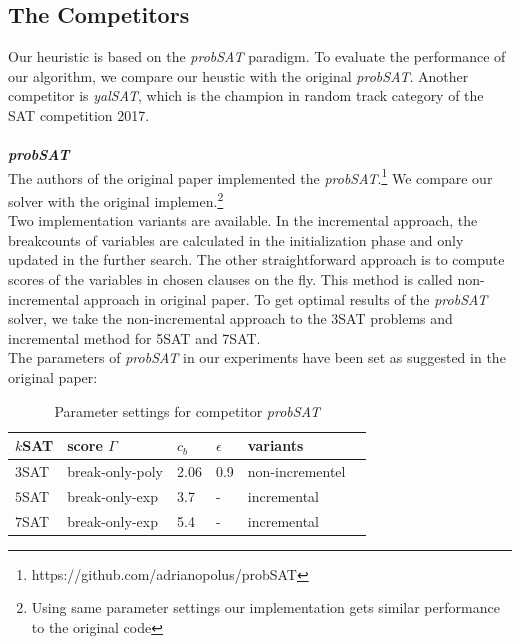\documentclass[12pt,a4paper,twoside]{scrartcl}
\numberwithin{equation}{section}
\begin{document}
\subsection{The Competitors}
\label{comparision}
Our heuristic is based on the \emph{probSAT} paradigm. To evaluate the performance of our algorithm, we compare our heustic with the original \emph{probSAT}. Another competitor is \emph{yalSAT}, which is the champion in random track category of the SAT competition 2017\cite{biere2014yet}.\\
\\
\emph{\textbf{probSAT}} 
\\
The authors of the original paper implemented the \emph{probSAT}.\footnote{https://github.com/adrianopolus/probSAT} We compare our solver with the original implemen.\footnote{Using same parameter settings our implementation gets similar performance to the original code}  \\
Two implementation variants are available. In the incremental approach, the breakcounts of variables are calculated in the initialization phase and only updated in the further search. The other straightforward approach is to compute scores of the variables in chosen clauses on the fly. This method is called non-incremental approach in original paper. To get optimal results of the \emph{probSAT} solver, we take the non-incremental approach to the 3SAT problems and incremental method for 5SAT and 7SAT.\\
The parameters of \emph{probSAT} in our experiments have been set as suggested in the original paper:\\
\begin{table}[h!]
\begin{center}
    \begin{tabular}{| l | l| l | l| l |p{3cm}|}
\hline 
    $k$SAT & score $\Gamma$ & $c_b$ & $\epsilon$ &variants \\ \hline
    $3$SAT & break-only-poly& 2.06 & 0.9 &non-incrementel \\ \hline
    $5$SAT & break-only-exp & 3.7 & - & incremental \\ \hline
    $7$SAT &  break-only-exp & 5.4 & - & incremental \\ \hline
\end{tabular}
\caption[probSAT]{Parameter settings for competitor \emph{probSAT}}
\end{center}
\end{table} 
\end{document}

